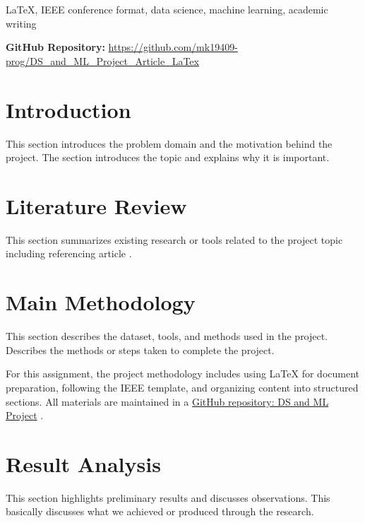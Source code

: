 \documentclass[conference]{IEEEtran}
\begin{document}
\begin{abstract}
This paper presents an overview of a data science and machine learning project. The objective is to demonstrate the creation of a research article using LaTeX and the IEEE conference template. This work also emphasizes structuring sections and integrating external resources such as a GitHub repository. This abstract summarizes the purpose of the paper in a few sentences.

\end{abstract} 


\begin{IEEEkeywords}
LaTeX, IEEE conference format, data science, machine learning, academic writing
\end{IEEEkeywords}

\noindent\textbf{GitHub Repository:} 
\color{blue}\url{https://github.com/mk19409-prog/DS_and_ML_Project_Article_LaTex}\color{black}





\section{Introduction}
This section introduces the problem domain and the motivation behind the project. The section introduces the topic and explains why it is important.

\section{Literature Review}
This section summarizes existing research or tools related to the project topic including referencing article \cite{karim2025comprehensive}.

\section{Main Methodology}
This section describes the dataset, tools, and methods used in the project. Describes the methods or steps taken to complete the project.

For this assignment, the project methodology includes using LaTeX for document preparation, following the IEEE template, and organizing content into structured sections.
All materials are maintained in a \color{blue}\href{https://github.com/mk19409-prog/DS_and_ML_Project_Article_LaTex}{GitHub repository: DS and ML Project} \color{black}
.


\section{Result Analysis}
This section highlights preliminary results and discusses observations. This basically discusses what we achieved or produced through the research.
\end{document}
